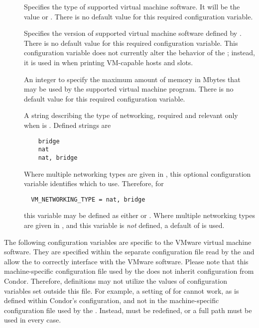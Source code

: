 \begin{description}

\item[]
  \label{param:VMType}
  Specifies the type of supported virtual machine software.
  It will be the value \verb@xen@ or \verb@vmware@.
  There is no default value for this required configuration variable.

\item[]
  \label{param:VMVersion}
  Specifies the version of supported virtual machine software
  defined by .  
  There is no default value for this required configuration variable.
  This configuration variable does not currently alter the behavior of
  the ; instead, it is used in  when
  printing VM-capable hosts and slots.

\item[]
  \label{param:VMMaxMemory}
  An integer to specify the maximum amount of memory in Mbytes
  that may be used by the supported virtual machine program.
  There is no default value for this required configuration variable.

\item[]
  \label{param:VMNetworkingType}
  A string describing the type of networking,
  required and relevant only when  is .
  Defined strings are
  \begin{verbatim}
    bridge
    nat
    nat, bridge
  \end{verbatim}

\item[]
  \label{param:VMNetworkingDefaultType}
  Where multiple networking types are given in ,
  this optional configuration variable identifies which to use.
  Therefore, for 
  \begin{verbatim}
  VM_NETWORKING_TYPE = nat, bridge
  \end{verbatim}
  this variable may be defined as either  or .
  Where multiple networking types are given in ,
  and this variable is \emph{not} defined, a default of 
  is used.

\end{description}

The following configuration variables are specific to the VMware
virtual machine software.  They are specified within the separate configuration
file read by the  and allow the  to
correctly interface with the VMware software.
Please note that this machine-specific configuration file 
used by the  does not inherit configuration
from Condor.  Therefore, definitions may not utilize the values
of configuration variables set outside this file.
For example,
a setting of  for
 cannot work,
as  is defined within Condor's configuration,
and not in the machine-specific configuration file
used by the .
Instead,  must be redefined,
or a full path must be used in every case.


